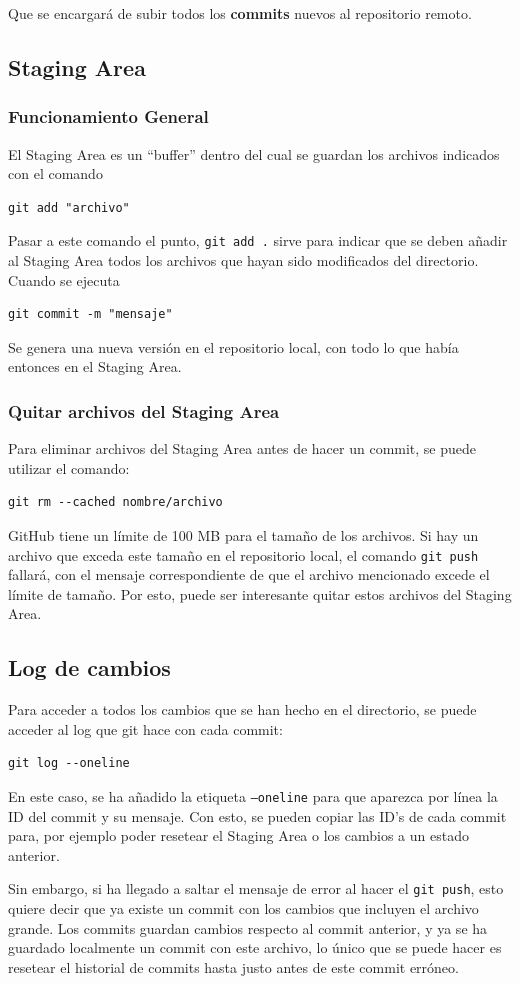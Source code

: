 \documentclass[
twoside,
12pt,                   
]{article}
\begin{document}
Que se encargará de subir todos los \textbf{commits} nuevos al repositorio remoto. 

\subsection{Staging Area}
\subsubsection{Funcionamiento General}
El Staging Area es un ``buffer'' dentro del cual se guardan los archivos indicados con el comando
\begin{lstlisting}[style=powershell]
    git add "archivo"
\end{lstlisting}
Pasar a este comando el punto, \texttt{git add .} sirve para indicar que se deben añadir al Staging Area todos los archivos que hayan sido modificados del directorio. Cuando se ejecuta
\begin{lstlisting}[style=powershell]
    git commit -m "mensaje"
\end{lstlisting}
Se genera una nueva versión en el repositorio local, con todo lo que había entonces en el Staging Area.

\subsubsection{Quitar archivos del Staging Area}
Para eliminar archivos del Staging Area antes de hacer un commit, se puede utilizar el comando:
\begin{lstlisting}[style=powershell]
    git rm --cached nombre/archivo
\end{lstlisting}
GitHub tiene un límite de 100 MB para el tamaño de los archivos. Si hay un archivo que exceda este tamaño en el repositorio local, el comando \texttt{git push} fallará, con el mensaje correspondiente de que el archivo mencionado excede el límite de tamaño. Por esto, puede ser interesante quitar estos archivos del Staging Area.

\subsection{Log de cambios}
Para acceder a todos los cambios que se han hecho en el directorio, se puede acceder al log que git hace con cada commit:
\begin{lstlisting}[style=powershell]
    git log --oneline
\end{lstlisting}
En este caso, se ha añadido la etiqueta \texttt{--oneline} para que aparezca por línea la ID del commit y su mensaje. Con esto, se pueden copiar las ID's de cada commit para, por ejemplo poder resetear el Staging Area o los cambios a un estado anterior.
\par Sin embargo, si ha llegado a saltar el mensaje de error al hacer el \texttt{git push}, esto quiere decir que ya existe un commit con los cambios que incluyen el archivo grande. Los commits guardan cambios respecto al commit anterior, y ya se ha guardado localmente un commit con este archivo, lo único que se puede hacer es resetear el historial de commits hasta justo antes de este commit erróneo.
\end{document}
